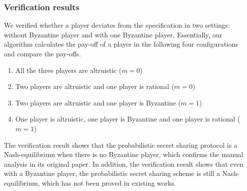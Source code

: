 \subsubsection{Verification results}
We verified whether a player deviates from the specification in two settings: without Byzantine player and
with one Byzantine player. 
Essentially, our algorithm calculates the pay-off of a player in the following four configurations and compare the pay-offs.
\begin{enumerate}
	\item All the three players are altruistic ($m=0$)
	\item Two players are altruistic and one player is rational ($m=0$)
	\item Two players are altruistic and one player is Byzantine ($m=1$)
	\item One player is altruistic, one player is Byzantine and one player is rational ($m=1$)
\end{enumerate}
The verification result shows that the probabilistic secret sharing protocol is a Nash-equilibrium when there is no Byzantine player,
which confirms the manual analysis in its original paper. In addition, the verification
result shows that even with a Byzantine player, the probabilistic secret sharing scheme is 
still a Nash-equilibrium, which has not been proved in existing works.


